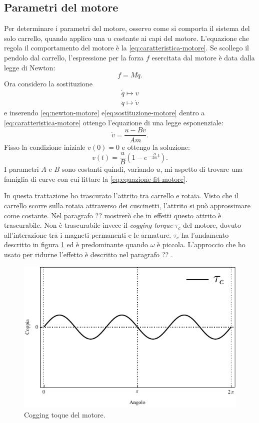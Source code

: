 \subsection{Parametri del motore}
\label{subsec:parametri-motore}
Per determinare i parametri del motore, osservo come si comporta il sistema del solo
carrello, quando applico una \ddp $u$ costante ai capi del motore.
L'equazione che regola il comportamento del motore è la \eqref{eq:caratteristica-motore}.
Se scollego il pendolo dal carrello, l'espressione per la forza $f$
esercitata dal motore è data dalla legge di Newton:
\begin{equation}
    f = M \ddot q.
    \label{eq:newton-motore}
\end{equation}
Ora considero la sostituzione
\begin{equation}
    \begin{aligned}
    \dot q \mapsto v \\
    \ddot q \mapsto \dot v
    \end{aligned}
    \label{eq:sostituzione-motore}
\end{equation}
e inserendo \eqref{eq:newton-motore} e\eqref{eq:sostituzione-motore} dentro a \eqref{eq:caratteristica-motore}
ottengo l'equazione di una legge esponenziale:
\begin{equation*}
    \dot v = \frac{u - B v} {Am}.
\end{equation*}
Fisso la condizione iniziale $v(0) = 0$ e ottengo la soluzione:
\begin{equation}
    v(t) = \frac u B \left(1 - e^{-\frac B {Am} t}\right).
    \label{eq:equazione-fit-motore}
\end{equation}
I parametri $A$ e $B$ sono costanti quindi, variando $u$, mi aspetto di trovare
una famiglia di curve con cui fittare la \eqref{eq:equazione-fit-motore}.

In questa trattazione ho trascurato l'attrito tra carrello e rotaia.
Visto che il carrello scorre sulla rotaia attraverso dei cuscinetti,
l'attrito si può approssimare come costante.
Nel paragrafo ??  mostrerò che in effetti questo attrito
è trascurabile.
Non è trascurabile invece il \emph{cogging torque} $\tau_c$ del motore,
dovuto all'interazione tra i magneti permanenti e le armature. $\tau_c$ ha
l'andamento descritto in figura \ref{fig:cogging} ed è predominante quando $\omega$ è
piccola.
L'approccio che ho usato per ridurne l'effetto è descritto nel paragrafo ?? .

\begin{figure}[hb]
    \centering
    \includegraphics{assets/cogging-torque}
    \caption[Cogging torque]{Cogging toque del motore.}
    \label{fig:cogging}
\end{figure}